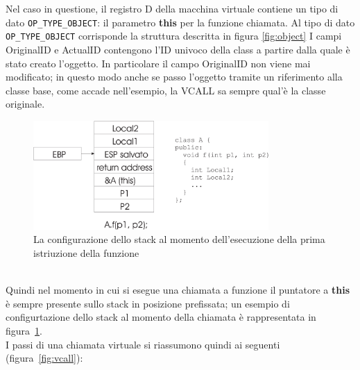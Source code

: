 \documentclass[a4paper, 11pt]{article}
\newcommand{\code}[1]{\scriptsize{\texttt{#1}}\normalsize}
\begin{document}
Nel caso in questione, il registro D della macchina virtuale contiene un tipo di dato \code{OP\_TYPE\_OBJECT}: il parametro \textbf{this} per la funzione chiamata.
Al tipo di dato \code{OP\_TYPE\_OBJECT} corrisponde la struttura descritta in figura \ref{fig:object}
I campi OriginalID e ActualID contengono l'ID univoco della class a partire dalla quale \`e stato creato l'oggetto. In particolare il campo OriginalID non viene mai modificato; in questo modo anche se passo l'oggetto tramite un riferimento alla classe base, come accade nell'esempio, la VCALL sa sempre qual'\`e la classe originale.
\begin{figure}[ht]
\centering
\includegraphics[width=0.8\textwidth]{stack.eps}
\caption{La configurazione dello stack al momento dell'esecuzione della prima istriuzione della funzione}
\label{fig:stack}
\end{figure}
\\
Quindi nel momento in cui si esegue una chiamata a funzione il puntatore a \textbf{this} \`e sempre presente sullo stack in posizione prefissata; un esempio di configurtazione dello stack al momento della 
chiamata \`e rappresentata in figura~\ref{fig:stack}.
\\
I passi di una chiamata virtuale si riassumono quindi ai seguenti (figura~\ref{fig:vcall}):
\end{document}
